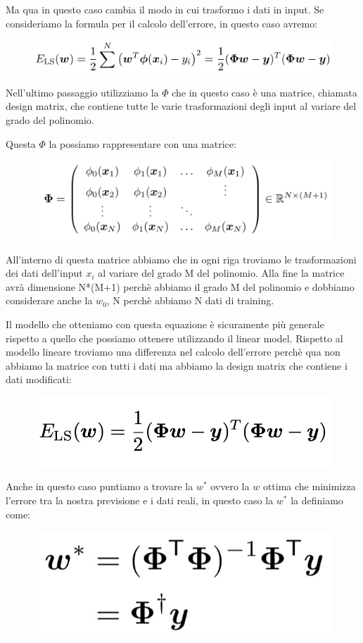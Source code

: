 \documentclass[14pt]{extreport}
\begin{document}
Ma qua in questo caso cambia il modo in cui trasformo i dati in input. Se consideriamo la formula per il calcolo dell'errore, in questo caso avremo:
\begin{figure}[H]
\centering
\includegraphics[width=0.7\linewidth]{79.jpeg}
\end{figure}

Nell'ultimo passaggio utilizziamo la $\Phi$ che in questo caso è una matrice, chiamata design matrix, che contiene tutte le varie trasformazioni degli
input al variare del grado del polinomio.

Questa $\Phi$ la possiamo rappresentare con una matrice:

\begin{figure}[H]
\centering
\includegraphics[width=0.7\linewidth]{80.jpeg}
\end{figure}


All'interno di questa matrice abbiamo che in ogni riga troviamo le trasformazioni dei dati dell'input $x_i$ al variare del grado M del polinomio. Alla
fine la matrice avrà dimensione N*(M+1) perchè abbiamo il grado M del polinomio e dobbiamo considerare anche la $w_0$, N perchè abbiamo N dati di
training.


Il modello che otteniamo con questa equazione è sicuramente più generale rispetto a quello che possiamo ottenere utilizzando il linear model. Rispetto
al modello lineare troviamo una differenza nel calcolo dell'errore perchè qua non abbiamo la matrice con tutti i dati ma abbiamo la design matrix che
contiene i dati modificati:

\begin{figure}[H]
\centering
\includegraphics[width=0.5\linewidth]{81.jpeg}
\end{figure}

Anche in questo caso puntiamo a trovare la $w^*$ ovvero la $w$ ottima che minimizza l'errore tra la nostra previsione e i dati reali, in questo caso
la $w^*$ la definiamo come:
\begin{figure}[H]
\centering
\includegraphics[width=0.4\linewidth]{82.jpeg}
\end{figure}
\end{document}
